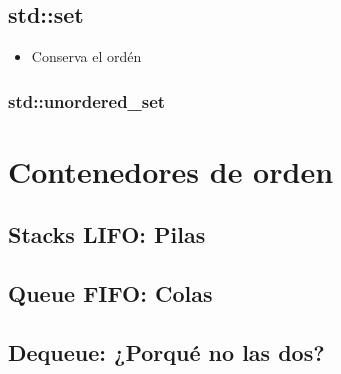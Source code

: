 \documentclass[12pt, fleqn]{report}                             %
\theoremstyle{break}                                            %
\begin{document}
        \section{std::set}

            \begin{itemize}
                \item Conserva el ordén
            \end{itemize}


            \subsection{std::unordered_set}


    \clearpage
    \chapter{Contenedores de orden}
                
        \clearpage
        \section{Stacks LIFO: Pilas}

        \clearpage
        \section{Queue FIFO: Colas}

        \clearpage
        \section{Dequeue: ¿Porqué no las dos?}
\end{document}
